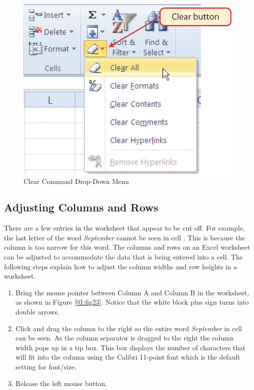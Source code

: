 \begin{figure}[H]
	\centering
	\includegraphics[width=\maxwidth{.95\linewidth}]{gfx/ch01_fig22}
	\caption{Clear Command Drop-Down Menu}
	\label{01:fig22}
\end{figure}

\subsection{Adjusting Columns and Rows}

There are a few entries in the worksheet that appear to be cut off. For example, the last letter of the word \textit{September} cannot be seen in cell . This is because the column is too narrow for this word. The columns and rows on an Excel worksheet can be adjusted to accommodate the data that is being entered into a cell. The following steps explain how to adjust the column widths and row heights in a worksheet.

\begin{enumerate}
	\item Bring the mouse pointer between Column A and Column B in the  worksheet, as shown in Figure \ref{01:fig23}. Notice that the white block plus sign turns into double arrows.
	\item Click and drag the column to the right so the entire word \textit{September} in cell  can be seen. As the column separator is dragged to the right the column width pops up in a tip box. This box displays the number of characters that will fit into the column using the Calibri 11-point font which is the default setting for font/size.
	\item Release the left mouse button.
\end{enumerate}


